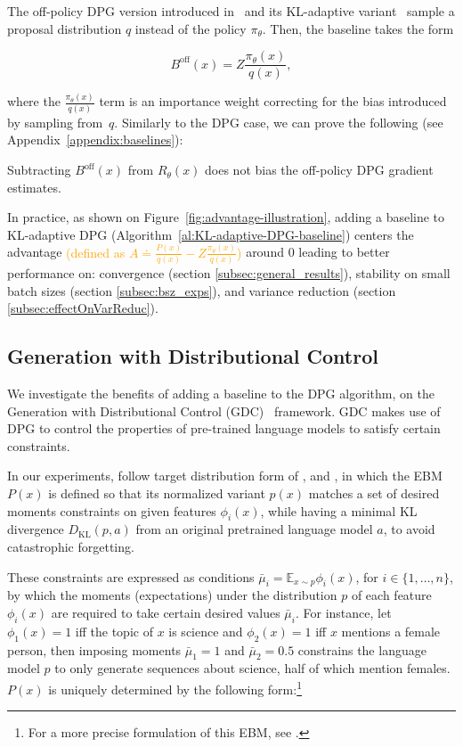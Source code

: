 The off-policy DPG version introduced in~\citep{opt-rl-arxiv-2019} and its KL-adaptive variant~\citep{khalifa_2021} sample a proposal distribution $q$ instead of the policy ${\pi_\theta}$. Then, the baseline takes the form

\begin{equation}
    B^\text{off}(x) = Z\frac{{\pi_\theta}(x)}{q(x)},
\end{equation}

where the $\frac{{\pi_\theta}(x)}{q(x)}$ term is an importance weight correcting for the bias introduced by sampling from~$q$. Similarly to the DPG case, we can prove the following (see Appendix~\ref{appendix:baselines}):

\begin{fact}
\label{dpgoff_baseline_unbiased}
Subtracting $B^\text{off}(x)$ from $R_\theta(x)$ does not bias the off-policy DPG gradient estimates.
\end{fact}

In practice, as shown on Figure~\ref{fig:advantage-illustration}, adding a baseline to KL-adaptive DPG  (Algorithm~\ref{al:KL-adaptive-DPG-baseline}) centers the advantage 
\textcolor{orange}{(defined as $A \doteq  \frac{P(x)}{q(x)} - Z\frac{{\pi_\theta}(x)}{q(x)}$)}
around 0 leading to better performance on: convergence (section \ref{subsec:general_results}), stability on small batch sizes (section \ref{subsec:bsz_exps}), and variance reduction (section \ref{subsec:effectOnVarReduc}).

\subsection{Generation with Distributional Control}

We investigate the benefits of adding a baseline to the DPG algorithm, on the Generation with Distributional Control (GDC)~\citep{khalifa_2021} framework. GDC makes use of DPG to control the properties of pre-trained language models to satisfy certain constraints. 

In our experiments, follow target distribution form of  \citet{A-parshakova-etal-2019-global}, \citet{khalifa_2021} and \citet{pmlr-v162-korbak22a}, in which the EBM $P(x)$ is defined  so that its  normalized variant $p(x)$ matches a set of desired moments constraints on given features $\phi_i(x)$, while having a minimal KL divergence $D_{\mathrm{KL}}(p,a)$ from an original pretrained language model $a$, to avoid catastrophic forgetting. 

These constraints are expressed as conditions $\bar{\mu}_i = \mathbb{E}_{x \sim p} \phi_i(x)$, for $i \in \{1,\dots,n\}$, by which the moments (expectations) under the distribution $p$ of each feature $\phi_i(x)$ are required to take certain desired values $\bar{\mu}_i$. For instance, let $\phi_1(x) = 1$ iff the topic of $x$ is science and $\phi_2(x) = 1$ iff $x$ mentions a female person, then imposing moments $\bar{\mu}_1 = 1$ and $\bar{\mu}_2 = 0.5$ constrains the language model $p$ to only generate sequences about science, half of which mention females. $P(x)$ is uniquely determined by the following  form:\footnote{For a more precise formulation of this EBM, see \citep{khalifa_2021}.}

